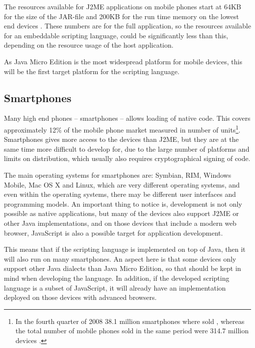 \documentclass[11pt]{report}
\begin{document}
The resources available for J2ME applications on mobile phones start at 64KB for the size of the JAR-file and 200KB for the run time memory on the lowest end devices \cite{nokia-optim}.
These numbers are for the full application, so the resources available for an embeddable scripting language, could be significantly less than this, depending on the resource usage of the host application.

As Java Micro Edition is the most widespread platform for mobile devices, this will be the first target platform for the scripting language.

\subsection{Smartphones}
Many high end phones -- smartphones --  allows loading of native code. 
This covers approximately 12\% of the mobile phone market measured in number of units\footnote{In the fourth quarter of 2008 38.1 million smartphones where sold \cite{gartner}, whereas the total number of mobile phones sold in the same period were 314.7 million devices \cite{cellular-news}.}.
Smartphones gives more access to the devices than J2ME, but they are at the same time more difficult to develop for, due to the large number of platforms and limits on distribution, which usually also requires cryptographical signing of code.

The main operating systems for smartphones are: Symbian, RIM, Windows Mobile, Mac OS X and Linux, which are very different operating systems, and even within the operating systems, there may be different user interfaces and programming models.
An important thing to notice is, development is not only possible as native applications, but many of the devices also support J2ME or other Java implementations, and on those devices that include a modern web browser, JavaScript is also a possible target for application development.

This means that if the scripting language is implemented on top of Java, then it will also run on many smartphones.  An aspect here is that some devices only support other Java dialects than Java Micro Edition, so that should be kept in mind when developing the language. In addition, if the developed scripting language is a subset of JavaScript, it will already have an implementation deployed on those devices with advanced browsers.
\end{document}
